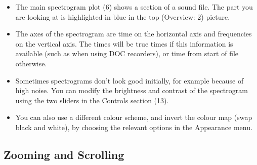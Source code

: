 \documentclass{article}
\begin{document}
\begin{itemize}
\item The main spectrogram plot (6) shows a section of a sound file. The part you are looking at is highlighted in blue in the top (Overview: 2) picture.

\item The axes of the spectrogram are time on the horizontal axis and frequencies on the vertical axis. The times will be true times if this information is available (such as when using DOC recorders), or time from start of file otherwise. 

\item Sometimes spectrograms don't look good initially, for example because of high noise. You can modify the brightness and contrast of the spectrogram using the two sliders in the Controls section (13). 
\item You can also use a different colour scheme, and invert the colour map (swap black and white), by choosing the relevant options in the Appearance menu.
\end{itemize}

\subsection{Zooming and Scrolling}
\end{document}
